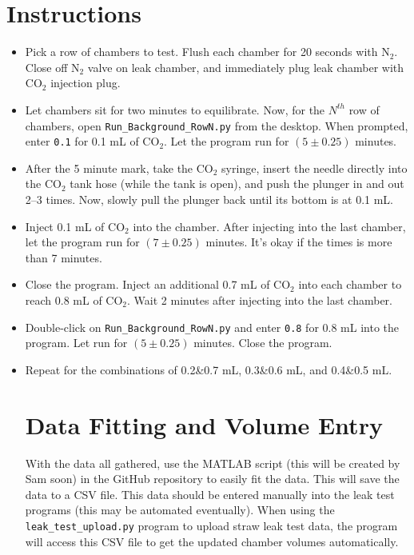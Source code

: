\documentclass[letterpaper,12pt]{article}
\begin{document}
\section{Instructions}
\begin{itemize}
	\item Pick a row of chambers to test. Flush each chamber for 20 seconds with N$_2$. Close off N$_2$ valve on leak chamber, and immediately plug leak chamber with CO$_2$ injection plug.
	\item Let chambers sit for two minutes to equilibrate. Now, for the $N^{th}$ row of chambers, open \verb|Run_Background_RowN.py| from the desktop. When prompted, enter \verb|0.1| for 0.1 mL of CO$_2$. Let the program run for $(5 \pm 0.25)$ minutes.
	\item After the 5 minute mark, take the CO$_2$ syringe, insert the needle directly into the CO$_2$ tank hose (while the tank is open), and push the plunger in and out 2--3 times. Now, slowly pull the plunger back until its bottom is at 0.1 mL.
	
	\item Inject 0.1 mL of CO$_2$ into the chamber. After injecting into the last chamber, let the program run for $(7 \pm 0.25)$ minutes. It's okay if the times is more than 7 minutes.
	\item Close the program. Inject an additional 0.7 mL of CO$_2$ into each chamber to reach 0.8 mL of CO$_2$. Wait 2 minutes after injecting into the last chamber.
	\item Double-click on \verb|Run_Background_RowN.py| and enter \verb|0.8| for 0.8 mL into the program. Let run for $(5 \pm 0.25)$ minutes. Close the program.
	\item Repeat for the combinations of 0.2\&0.7 mL, 0.3\&0.6 mL, and 0.4\&0.5 mL.
	
\section{Data Fitting and Volume Entry}
	With the data all gathered, use the MATLAB script (this will be created by Sam soon) in the GitHub repository to easily fit the data. This will save the data to a CSV file. This data should be entered manually into the leak test programs (this may be automated eventually). When using the \verb|leak_test_upload.py| program to upload straw leak test data, the program will access this CSV file to get the updated chamber volumes automatically.

\end{itemize}
\end{document}

